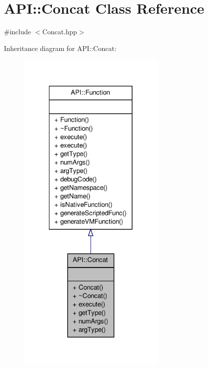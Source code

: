 \hypertarget{class_a_p_i_1_1_concat}{\section{A\-P\-I\-:\-:Concat Class Reference}
\label{class_a_p_i_1_1_concat}
}


{\ttfamily \#include $<$Concat.\-hpp$>$}



Inheritance diagram for A\-P\-I\-:\-:Concat\-:
\nopagebreak
\begin{figure}[H]
\begin{center}
\leavevmode
\includegraphics[width=206pt]{class_a_p_i_1_1_concat__inherit__graph}
\end{center}
\end{figure}


